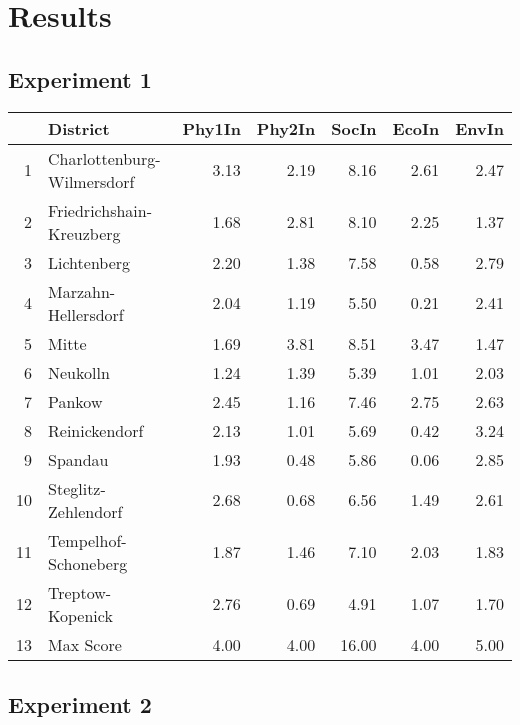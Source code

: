 \chapter{Results}

\section{Experiment 1}

\lipsum  
% 
\begin{tabular}{rlrrrrr}
  \hline
 & District & Phy1In & Phy2In & SocIn & EcoIn & EnvIn \\ 
  \hline
1 & Charlottenburg-Wilmersdorf & 3.13 & 2.19 & 8.16 & 2.61 & 2.47 \\ 
  2 & Friedrichshain-Kreuzberg & 1.68 & 2.81 & 8.10 & 2.25 & 1.37 \\ 
  3 & Lichtenberg & 2.20 & 1.38 & 7.58 & 0.58 & 2.79 \\ 
  4 & Marzahn-Hellersdorf & 2.04 & 1.19 & 5.50 & 0.21 & 2.41 \\ 
  5 & Mitte & 1.69 & 3.81 & 8.51 & 3.47 & 1.47 \\ 
  6 & Neukolln & 1.24 & 1.39 & 5.39 & 1.01 & 2.03 \\ 
  7 & Pankow & 2.45 & 1.16 & 7.46 & 2.75 & 2.63 \\ 
  8 & Reinickendorf & 2.13 & 1.01 & 5.69 & 0.42 & 3.24 \\ 
  9 & Spandau & 1.93 & 0.48 & 5.86 & 0.06 & 2.85 \\ 
  10 & Steglitz-Zehlendorf & 2.68 & 0.68 & 6.56 & 1.49 & 2.61 \\ 
  11 & Tempelhof-Schoneberg & 1.87 & 1.46 & 7.10 & 2.03 & 1.83 \\ 
  12 & Treptow-Kopenick & 2.76 & 0.69 & 4.91 & 1.07 & 1.70 \\ 
  13 & Max Score & 4.00 & 4.00 & 16.00 & 4.00 & 5.00 \\ 
   \hline
\end{tabular}


\section{Experiment 2}

\lipsum  %
